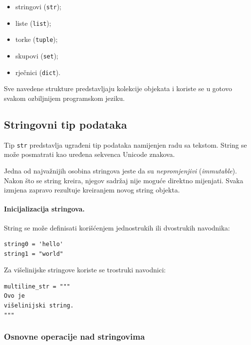 \begin{itemize}
	\item stringovi (\texttt{str});
	\item liste (\texttt{list});
	\item torke (\texttt{tuple});
	\item skupovi (\texttt{set});
	\item rječnici (\texttt{dict}).
\end{itemize}

Sve navedene strukture predstavljaju kolekcije objekata i koriste se u gotovo svakom ozbiljnijem programskom jeziku.

\subsection{Stringovni tip podataka}

Tip \texttt{str} predstavlja ugrađeni tip podataka namijenjen radu sa tekstom. String se može posmatrati kao uređena sekvenca Unicode znakova.

Jedna od najvažnijih osobina stringova jeste da su \textit{nepromjenjivi} (\textit{immutable}). Nakon što se string kreira, njegov sadržaj nije moguće direktno mijenjati. Svaka izmjena zapravo rezultuje kreiranjem novog string objekta.

\paragraph{Inicijalizacija stringova.}  String se može definisati korišćenjem jednostrukih ili dvostrukih navodnika:

\begin{verbatim}
string0 = 'hello'
string1 = "world"
\end{verbatim}

Za višelinijske stringove koriste se trostruki navodnici:

\begin{verbatim}
multiline_str = """
Ovo je
višelinijski string.
"""
\end{verbatim}

\subsubsection*{Osnovne operacije nad stringovima}

